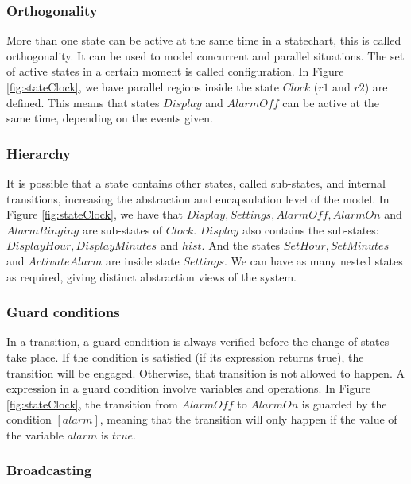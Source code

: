 \subsubsection{Orthogonality}

More than one state can be active at the same time in a statechart, this is called orthogonality. It can be used to model concurrent and parallel situations. The set of active states in a certain moment is called configuration. In Figure \ref{fig:stateClock}, we have parallel regions inside the state $Clock$ ($r1$ and $r2$) are defined. This means that states $Display$ and $AlarmOff$ can be active at the same time, depending on the events given.

\subsubsection{Hierarchy}

It is possible that a state contains other states, called sub-states, and internal transitions, increasing the abstraction and encapsulation level of the model. In Figure \ref{fig:stateClock}, we have that $Display, Settings, AlarmOff, AlarmOn$ and $AlarmRinging$ are sub-states of $Clock$. $Display$ also contains the sub-states: $DisplayHour, DisplayMinutes$ and $hist$. And the states $SetHour, SetMinutes$ and $ActivateAlarm$ are inside state $Settings$. We can have as many nested states as required, giving distinct abstraction views of the system.

\subsubsection{Guard conditions}

In a transition, a guard condition is always verified before the change of states take place. If the condition is satisfied (if its expression returns true), the transition will be engaged. Otherwise, that transition is not allowed to happen. A expression in a guard condition involve variables and operations. In Figure \ref{fig:stateClock}, the transition from $AlarmOff$ to $AlarmOn$ is guarded by the condition $[alarm]$, meaning that the transition will only happen if the value of the variable $alarm$ is $true$.

\subsubsection{Broadcasting}

